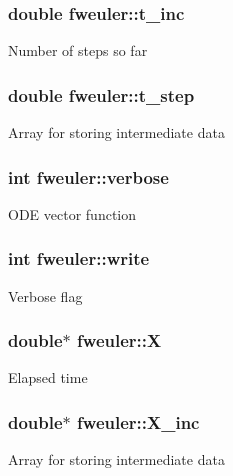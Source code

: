\subsubsection[{t\+\_\+inc}]{\setlength{\rightskip}{0pt plus 5cm}double fweuler\+::t\+\_\+inc}\label{structfweuler_a24bbdf908ad0e3997194b2f9901a93e4}
Number of steps so far \hypertarget{structfweuler_a34810f998eae03fbeaa53d37b73ec366}{}
\subsubsection[{t\+\_\+step}]{\setlength{\rightskip}{0pt plus 5cm}double fweuler\+::t\+\_\+step}\label{structfweuler_a34810f998eae03fbeaa53d37b73ec366}
Array for storing intermediate data \hypertarget{structfweuler_a71969341520cf6b76abcc298471743da}{}
\subsubsection[{verbose}]{\setlength{\rightskip}{0pt plus 5cm}int fweuler\+::verbose}\label{structfweuler_a71969341520cf6b76abcc298471743da}
O\+D\+E vector function \hypertarget{structfweuler_a6f9c2735d7a016c50a343b17cde41d5d}{}
\subsubsection[{write}]{\setlength{\rightskip}{0pt plus 5cm}int fweuler\+::write}\label{structfweuler_a6f9c2735d7a016c50a343b17cde41d5d}
Verbose flag \hypertarget{structfweuler_ae6a7a8f3084e4a42a4c7da4c4a36dcc0}{}
\subsubsection[{X}]{\setlength{\rightskip}{0pt plus 5cm}double$\ast$ fweuler\+::\+X}\label{structfweuler_ae6a7a8f3084e4a42a4c7da4c4a36dcc0}
Elapsed time \hypertarget{structfweuler_abb379c1efee260436de2484366a53c47}{}
\subsubsection[{X\+\_\+inc}]{\setlength{\rightskip}{0pt plus 5cm}double$\ast$ fweuler\+::\+X\+\_\+inc}\label{structfweuler_abb379c1efee260436de2484366a53c47}
Array for storing intermediate data \hypertarget{structfweuler_aceb1a0fdb7cb920512268ff3031b70dd}{}
